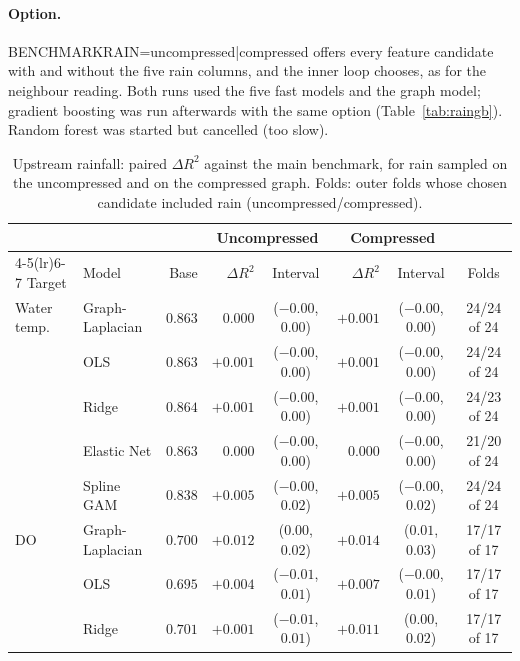 \documentclass[11pt]{article}
\newcommand{\codeus}{\textunderscore\allowbreak}
\newcommand{\code}[1]{{\ttfamily\let\_\codeus #1}}
\begin{document}
\paragraph{Option.} \code{BENCHMARK\_RAIN=uncompressed|compressed} offers every feature candidate
with and without the five rain columns, and the inner loop chooses, as for the neighbour reading.
Both runs used the five fast models and the graph model; gradient boosting was run afterwards with
the same option (Table~\ref{tab:raingb}). Random forest was started but cancelled (too slow).

\begin{table}[h]
\centering
\small
\caption{Upstream rainfall: paired $\Delta R^2$ against the main benchmark, for rain sampled on the
uncompressed and on the compressed graph. Folds: outer folds whose chosen candidate included rain
(uncompressed/compressed).}
\label{tab:rain}
\footnotesize
\setlength{\tabcolsep}{4pt}
\begin{tabular}{ll r rc rc c}
\toprule
 & & & \multicolumn{2}{c}{Uncompressed} & \multicolumn{2}{c}{Compressed} & \\
\cmidrule(lr){4-5}\cmidrule(lr){6-7}
Target & Model & Base & $\Delta R^2$ & Interval & $\Delta R^2$ & Interval & Folds \\
\midrule
Water temp.   & Graph-Laplacian & $0.863$ & $0.000$ & ($-0.00$, $0.00$) & $+0.001$ & ($-0.00$, $0.00$) & 24/24 of 24 \\
              & OLS             & $0.863$ & $+0.001$ & ($-0.00$, $0.00$) & $+0.001$ & ($-0.00$, $0.00$) & 24/24 of 24 \\
              & Ridge           & $0.864$ & $+0.001$ & ($-0.00$, $0.00$) & $+0.001$ & ($-0.00$, $0.00$) & 24/23 of 24 \\
              & Elastic Net     & $0.863$ & $0.000$ & ($-0.00$, $0.00$) & $0.000$ & ($-0.00$, $0.00$) & 21/20 of 24 \\
              & Spline GAM      & $0.838$ & $+0.005$ & ($-0.00$, $0.02$) & $+0.005$ & ($-0.00$, $0.02$) & 24/24 of 24 \\
\addlinespace
DO            & Graph-Laplacian & $0.700$ & $\mathbf{+0.012}$ & ($0.00$, $0.02$) & $\mathbf{+0.014}$ & ($0.01$, $0.03$) & 17/17 of 17 \\
              & OLS             & $0.695$ & $+0.004$ & ($-0.01$, $0.01$) & $+0.007$ & ($-0.00$, $0.01$) & 17/17 of 17 \\
              & Ridge           & $0.701$ & $+0.001$ & ($-0.01$, $0.01$) & $\mathbf{+0.011}$ & ($0.00$, $0.02$) & 17/17 of 17 \\

\end{tabular}
\end{table}
\end{document}
